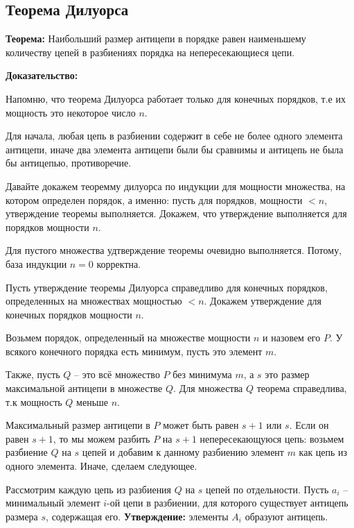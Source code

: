 \subsection{Теорема Дилуорса}

\textbf{Теорема:} Наибольший размер антицепи в порядке равен наименьшему количеству цепей в разбиениях порядка на непересекающиеся цепи.

\textbf{Доказательство:} 

\hspace{0.5cm}\parbox{17cm} {
    Напомню, что теорема Дилуорса работает только для конечных порядков, т.е их мощность это некоторое число $n$. 

    Для начала, любая цепь в разбиении содержит в себе не более одного элемента антицепи, иначе два элемента антицепи были бы сравнимы и антицепь не была бы антицепью, противоречие.

    Давайте докажем теоремму дилуорса по индукции для мощности множества, на котором определен порядок, а именно: пусть для порядков, мощности $< n$, утверждение теоремы выполняется. Докажем, что утверждение выполняется для порядков мощности $n$.

    Для пустого множества удтверждение теоремы очевидно выполняется. Потому, база индукции $n = 0$ корректна.

    Пусть утверждение теоремы Дилуорса справедливо для конечных порядков, определенных на множествах мощностью $< n$. Докажем утверждение для конечных порядков мощности $n$.

    Возьмем порядок, определенный на множестве мощности $n$ и назовем его $P$. У всякого конечного порядка есть минимум, пусть это элемент $m$.

    Также, пусть $Q$ -- это всё множество $P$ без минимума $m$, а $s$ это размер максимальной антицепи в множестве $Q$. Для множества $Q$ теорема справедлива, т.к мощность $Q$ меньше $n$.

    Максимальный размер антицепи в $P$ может быть равен $s + 1$ или $s$. Если он равен $s + 1$, то мы можем разбить $P$ на $s + 1$ непересекающуюся цепь: возьмем разбиение $Q$ на $s$ цепей и добавим к данному разбиению элемент $m$ как цепь из одного элемента. Иначе, сделаем следующее.

    Рассмотрим каждую цепь из разбиения $Q$ на $s$ цепей по отдельности. Пусть $a_i$ -- минимальный элемент $i$-ой цепи в разбиении, для которого существует антицепь размера $s$, содержащая его. \textbf{Утверждение:} элементы $A_i$ образуют антицепь.

}
